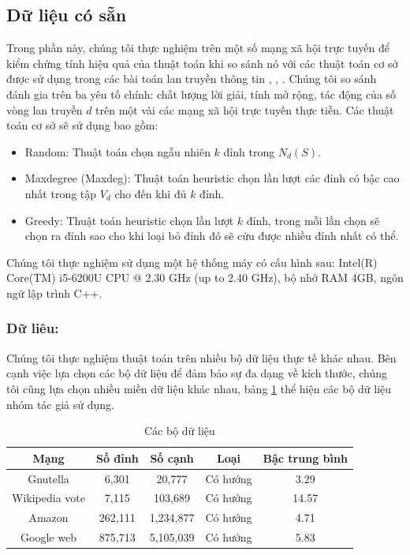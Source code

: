 \subsection{Dữ liệu có sẵn}

Trong phần này, chúng tôi thực nghiệm trên một số mạng xã hội trực tuyến để kiểm chứng tính hiệu quả của thuật toán khi so sánh nó với các thuật toán cơ sở được sử dụng trong các bài toán lan truyền thông tin \cite{nguyen30}, \cite{kemple1}, \cite{zhang32}. Chúng tôi so sánh đánh gia trên ba yêu tố chính: chất lượng lời giải, tính mở rộng, tác động của số vòng lan truyền $d$ trên một vài các mạng xã hội trực tuyến thực tiễn. Các thuật toán cơ sở sẽ sử dụng bao gồm:
\begin{itemize}
\item Random: Thuật toán chọn ngẫu nhiên $k$ đỉnh trong $N_{d}(S)$.

\item Maxdegree (Maxdeg): Thuật toán heuristic chọn lần lượt các đỉnh có bậc cao nhất trong tập $V_{d}$ cho đến khi đủ $k$ đỉnh.

\item Greedy: Thuật toán heuristic chọn lần lượt $k$ đỉnh, trong mỗi lần chọn sẽ chọn ra đỉnh sao cho khi loại bỏ đỉnh đó sẽ cứu được nhiều đỉnh nhất có thể.
\end{itemize}

Chúng tôi thực nghiệm sử dụng một hệ thống máy có cấu hình sau: Intel(R) Core(TM) i5-6200U CPU @ 2.30 GHz (up to 2.40 GHz), bộ nhớ RAM 4GB, ngôn ngữ lập trình C++.

\subsubsection{Dữ liêu:}

Chúng tôi thực nghiệm thuật toán trên nhiều bộ dữ liệu thực tế khác nhau. Bên cạnh việc lựa chọn các bộ dữ liệu để đảm bảo sự đa dạng về kích thước, chúng tôi cũng lựa chọn nhiều miền dữ liệu khác nhau, bảng \ref{tab:Table1} thể hiện các bộ dữ liệu nhóm tác giả sử dụng.
\begin{table}
	\centering
	\begin{tabular}{|c|c|c|c|c|}
		\hline 
		Mạng & Số đỉnh & Số cạnh & Loại & Bậc trung bình \\ 
		\hline 
		Gnutella & 6,301 & 20,777 & Có hướng & 3.29 \\ 
		\hline 
		Wikipedia vote & 7,115 & 103,689 & Có hướng & 14.57 \\ 
		\hline 
		Amazon & 262,111 & 1,234,877 & Có hướng & 4.71 \\ 
		\hline 
		Google web & 875,713 & 5,105,039 & Có hướng & 5.83 \\ 
		\hline 
	\end{tabular} 
	\caption{Các bộ dữ liệu}
	\label{tab:Table1}
\end{table}

